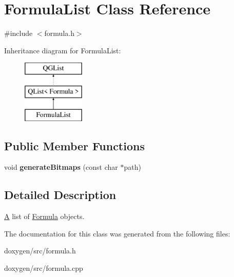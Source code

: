 \hypertarget{class_formula_list}{}\section{Formula\+List Class Reference}
\label{class_formula_list}


{\ttfamily \#include $<$formula.\+h$>$}

Inheritance diagram for Formula\+List\+:\begin{figure}[H]
\begin{center}
\leavevmode
\includegraphics[height=3.000000cm]{class_formula_list}
\end{center}
\end{figure}
\subsection*{Public Member Functions}
\begin{DoxyCompactItemize}
\item 
\mbox{\label{class_formula_list_a2fafeac31c525057a50c6e584f9470c6}} 
void {\bfseries generate\+Bitmaps} (const char $\ast$path)
\end{DoxyCompactItemize}


\subsection{Detailed Description}
\mbox{\hyperlink{class_a}{A}} list of \mbox{\hyperlink{class_formula}{Formula}} objects. 

The documentation for this class was generated from the following files\+:\begin{DoxyCompactItemize}
\item 
doxygen/src/formula.\+h\item 
doxygen/src/formula.\+cpp\end{DoxyCompactItemize}
